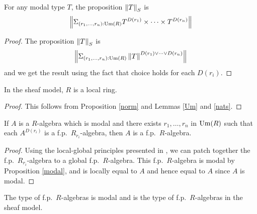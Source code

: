    \begin{proposition}\label{norm}
      For any modal type $T$, the proposition $\left\lVert T \right\rVert_S$ is
      $$\left\lVert \Sigma_{(r_1,\dots,r_n):\mathrm{Um}(R)}T^{D(r_1)}\times\dots\times T^{D(r_n)} \right\rVert$$
    \end{proposition}
    
    \begin{proof}
      The proposition $\left\lVert T \right\rVert_S$ is
      $$\left\lVert \Sigma_{(r_1,\dots,r_n):\mathrm{Um}(R)}\left\lVert T \right\rVert^{D(r_1)\vee\dots\vee D(r_n)} \right\rVert$$
      and we get the result using the fact that choice holds for each $D(r_i)$.
    \end{proof}
    
    \begin{proposition}
      In the sheaf model, $R$ is a local ring.
    \end{proposition}

    \begin{proof}
      This follows from Proposition \ref{norm} and Lemmas \ref{Um} and \ref{nats}.
    \end{proof}

    \begin{lemma}\label{localfp}
      If $A$ is a $R$-algebra which is modal and there exists $r_1,\dots,r_n$ in $\mathrm{Um}(R)$ such that each
      $A^{D(r_i)}$ is a f.p.\ $R_{r_i}$-algebra, then $A$ is a f.p.\ $R$-algebra.
    \end{lemma}
    
    \begin{proof}
      Using the local-global principles presented in \cite{lombardi-quitte}, we can patch together the f.p.\ $R_{r_i}$-algebra
      to a global f.p.\ $R$-algebra. This f.p.\ $R$-algebra is modal by Proposition \ref{modal}, and is locally equal to $A$
      and hence equal to $A$ since $A$ is modal.
    \end{proof}

    \begin{corollary}
      The type of f.p.\ $R$-algebras is modal and is the type of f.p.\ $R$-algebras in the sheaf model.
    \end{corollary}

